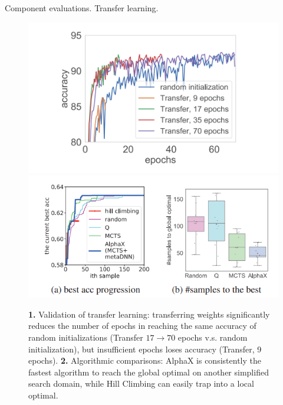 \documentclass{beamer}
\begin{document}
\begin{frame}{Component evaluations. Transfer learning.}
    \begin{figure}
        \centering
        \includegraphics[scale=0.5]{images/nas10.png}
        \includegraphics[scale=0.5]{images/nas11.png}
        \caption{\textbf{1.} Validation of transfer learning: transferring
weights significantly reduces the number of epochs in reaching the same accuracy of random initializations (Transfer $17 \to 70$ epochs v.s. random initialization), but insufficient epochs loses accuracy (Transfer, 9 epochs). \textbf{2.} Algorithmic comparisons: AlphaX is consistently the fastest algorithm to reach the global optimal on another
simplified search domain, while Hill Climbing
can easily trap into a local optimal.}
        \label{fig:enter-label}
    \end{figure} 
\end{frame}
\end{document}
